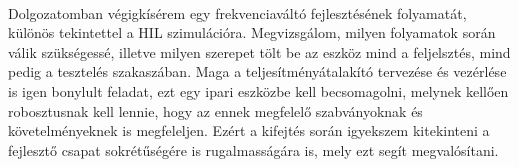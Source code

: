 \paragraph{}
Dolgozatomban végigkísérem egy frekvenciaváltó fejlesztésének folyamatát, különös tekintettel a HIL szimulációra. Megvizsgálom, milyen folyamatok során válik szükségessé, illetve milyen szerepet tölt be az eszköz mind a feljelsztés, mind pedig a tesztelés szakaszában. Maga a teljesítményátalakító tervezése és vezérlése is igen bonylult feladat, ezt egy ipari eszközbe kell becsomagolni, melynek kellően robosztusnak kell lennie, hogy az ennek megfelelő szabványoknak és követelményeknek is megfeleljen. Ezért a kifejtés során igyekszem kitekinteni a fejlesztő csapat sokrétűségére is rugalmasságára is, mely ezt segít megvalósítani.